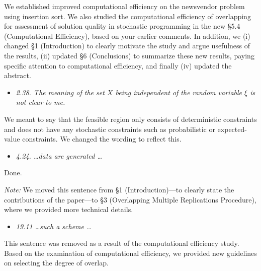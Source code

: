 \documentclass[11pt,notitlepage,onecolumn]{article}
\newcommand{\noi}{\noindent}
\begin{document}
\noi 
We established improved computational efficiency on the newsvendor problem using insertion sort.
We also studied the computational efficiency of overlapping for assessment of solution quality in stochastic programming in the new \S 5.4 (Computational Efficiency), based on your earlier comments. 
In addition, we (i) changed \S 1 (Introduction) to clearly motivate the study and argue usefulness of the results, (ii) updated \S 6 (Conclusions) to summarize these new results, paying specific attention to computational efficiency, and finally (iv) updated the abstract.  
\medskip



\bigskip 


\noi {\bf \large Minor comments:}
\medskip 



\begin{itemize}
\item[] \textit{2.38. The meaning of the set $X$ being independent of the random variable $\xi$ is not clear to me.}
\end{itemize}

\noi 
We meant to say that the feasible region only consists of deterministic constraints and does not have any stochastic constraints such as probabilistic or expected-value constraints. 
We changed the wording to reflect this. 
\medskip 


\begin{itemize}
\item[] \textit{4.24. \ldots data are generated \ldots}
\end{itemize}

\noi 
Done.
\medskip

\noi
{\it Note:}
We moved this sentence from \S 1 (Introduction)---to clearly state the contributions of the paper---to \S 3 (Overlapping Multiple Replications Procedure), where we provided more technical details. 
\medskip 

\begin{itemize}
\item[] \textit{19.11 \ldots such a scheme \ldots}
\end{itemize}

\noi
This sentence was removed as a result of the computational efficiency study. 
Based on the examination of computational efficiency, we provided new guidelines on selecting the degree of overlap. 
\end{document}
